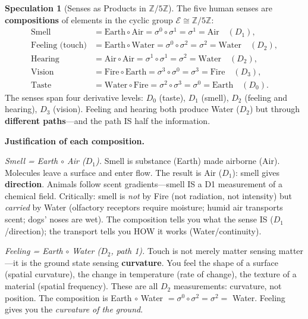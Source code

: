 \documentclass[11pt]{article}
\theoremstyle{definition}
\newtheorem{speculation}[theorem]{Speculation}
\theoremstyle{remark}
\begin{document}
\begin{speculation}[Senses as Products in $\mathbb{Z}/5\mathbb{Z}$]
\label{spec:senses}
The five human senses are \textbf{compositions} of elements in the cyclic
group $\mathcal{E} \cong \mathbb{Z}/5\mathbb{Z}$:
\begin{align}
  \text{Smell} &= \text{Earth} \circ \text{Air} = \sigma^0 \circ \sigma^1 = \sigma^1 = \text{Air} \quad (D_1), \\
  \text{Feeling (touch)} &= \text{Earth} \circ \text{Water} = \sigma^0 \circ \sigma^2 = \sigma^2 = \text{Water} \quad (D_2), \\
  \text{Hearing} &= \text{Air} \circ \text{Air} = \sigma^1 \circ \sigma^1 = \sigma^2 = \text{Water} \quad (D_2), \\
  \text{Vision} &= \text{Fire} \circ \text{Earth} = \sigma^3 \circ \sigma^0 = \sigma^3 = \text{Fire} \quad (D_3), \\
  \text{Taste} &= \text{Water} \circ \text{Fire} = \sigma^2 \circ \sigma^3 = \sigma^0 = \text{Earth} \quad (D_0).
\end{align}
The senses span four derivative levels: $D_0$ (taste), $D_1$ (smell),
$D_2$ (feeling and hearing), $D_3$ (vision).  Feeling and hearing both
produce Water ($D_2$) but through \textbf{different paths}---and the path
IS half the information.
\end{speculation}

\textbf{Justification of each composition.}

\emph{Smell = Earth $\circ$ Air ($D_1$).}
Smell is substance (Earth) made airborne (Air).  Molecules leave a surface
and enter flow.  The result is Air ($D_1$): smell gives \textbf{direction}.
Animals follow scent gradients---smell IS a D1 measurement of a chemical
field.  Critically: smell is \emph{not} by Fire (not radiation, not
intensity) but \emph{carried} by Water (olfactory receptors require
moisture; humid air transports scent; dogs' noses are wet).  The
composition tells you what the sense IS ($D_1$/direction); the transport
tells you HOW it works (Water/continuity).

\emph{Feeling = Earth $\circ$ Water ($D_2$, path 1).}
Touch is not merely matter sensing matter---it is the ground state sensing
\textbf{curvature}.  You feel the shape of a surface (spatial curvature),
the change in temperature (rate of change), the texture of a material
(spatial frequency).  These are all $D_2$ measurements: curvature, not
position.  The composition is Earth $\circ$ Water $= \sigma^0 \circ \sigma^2
= \sigma^2 = $ Water.  Feeling gives you the \emph{curvature of the ground}.
\end{document}
